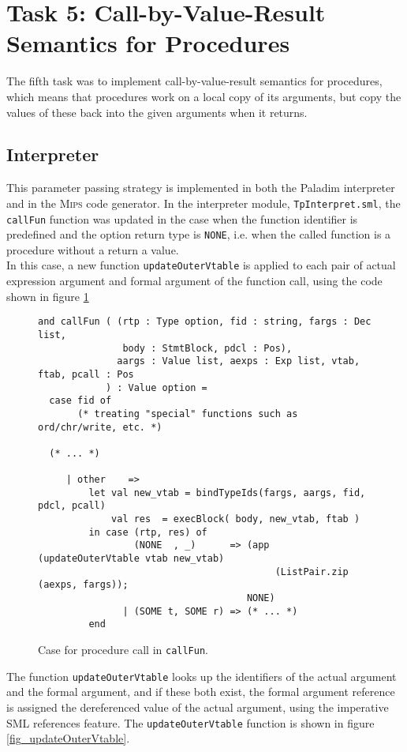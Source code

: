 \section{Task 5: Call-by-Value-Result Semantics for Procedures}
The fifth task was to implement call-by-value-result semantics for procedures,
which means that procedures work on a local copy of its arguments, but copy the
values of these back into the given arguments when it returns.

\subsection{Interpreter}
This parameter passing strategy is implemented in both the \textsf{Paladim}
interpreter and in the \textsc{Mips} code generator. In the interpreter module,
\verb|TpInterpret.sml|, the \verb|callFun| function was updated in the case when
the function identifier is predefined and the  option return type is
\verb|NONE|, i.e. when the called function is a procedure without a return a
value.\\
In this case, a new function \verb|updateOuterVtable| is applied to each pair of
actual expression argument and formal argument of the function call, using the
code shown in figure \ref{fig_callFun}
 
\begin{figure}[H]
  \begin{lstlisting}[style=MLStyle]
and callFun ( (rtp : Type option, fid : string, fargs : Dec list,
               body : StmtBlock, pdcl : Pos),
              aargs : Value list, aexps : Exp list, vtab, ftab, pcall : Pos
            ) : Value option =
  case fid of
       (* treating "special" functions such as ord/chr/write, etc. *)

  (* ... *)

     | other    =>
         let val new_vtab = bindTypeIds(fargs, aargs, fid, pdcl, pcall)
             val res  = execBlock( body, new_vtab, ftab )
         in case (rtp, res) of
                 (NONE  , _)      => (app (updateOuterVtable vtab new_vtab)
                                          (ListPair.zip (aexps, fargs));
                                     NONE)
               | (SOME t, SOME r) => (* ... *)
         end
  \end{lstlisting}
  \caption{Case for procedure call in \texttt{callFun}.}
  \label{fig_callFun}
\end{figure}

\noindent
The function \verb|updateOuterVtable| looks up the identifiers of the actual
argument and the formal argument, and if these both exist, the formal argument
reference is assigned the dereferenced value of the actual argument, using the
imperative SML references feature. The \verb|updateOuterVtable| function is
shown in figure \ref{fig_updateOuterVtable}.
 
